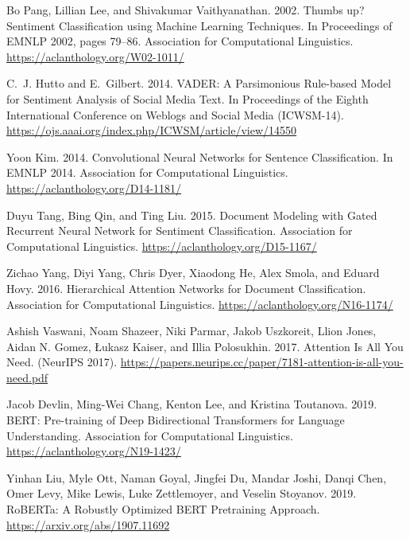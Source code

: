 \documentclass[12pt,a4paper]{article}
\begin{document}
\begin{thebibliography}{9}

Bo Pang, Lillian Lee, and Shivakumar Vaithyanathan. 2002. Thumbs up? Sentiment Classification using Machine Learning Techniques. In Proceedings of EMNLP 2002, pages 79–86. Association for Computational Linguistics. \url{https://aclanthology.org/W02-1011/}

C.~J. Hutto and E.~Gilbert. 2014. VADER: A Parsimonious Rule-based Model for Sentiment Analysis of Social Media Text. In Proceedings of the Eighth International Conference on Weblogs and Social Media (ICWSM-14). \url{https://ojs.aaai.org/index.php/ICWSM/article/view/14550}

Yoon Kim. 2014. Convolutional Neural Networks for Sentence Classification. In EMNLP 2014. Association for Computational Linguistics. \url{https://aclanthology.org/D14-1181/}

Duyu Tang, Bing Qin, and Ting Liu. 2015. Document Modeling with Gated Recurrent Neural Network for Sentiment Classification. Association for Computational Linguistics. \url{https://aclanthology.org/D15-1167/}

Zichao Yang, Diyi Yang, Chris Dyer, Xiaodong He, Alex Smola, and Eduard Hovy. 2016. Hierarchical Attention Networks for Document Classification. Association for Computational Linguistics. \url{https://aclanthology.org/N16-1174/}

Ashish Vaswani, Noam Shazeer, Niki Parmar, Jakob Uszkoreit, Llion Jones, Aidan N. Gomez, Łukasz Kaiser, and Illia Polosukhin. 2017. Attention Is All You Need.  (NeurIPS 2017). \url{https://papers.neurips.cc/paper/7181-attention-is-all-you-need.pdf}

Jacob Devlin, Ming-Wei Chang, Kenton Lee, and Kristina Toutanova. 2019. BERT: Pre-training of Deep Bidirectional Transformers for Language Understanding. Association for Computational Linguistics. \url{https://aclanthology.org/N19-1423/}

Yinhan Liu, Myle Ott, Naman Goyal, Jingfei Du, Mandar Joshi, Danqi Chen, Omer Levy, Mike Lewis, Luke Zettlemoyer, and Veselin Stoyanov. 2019. RoBERTa: A Robustly Optimized BERT Pretraining Approach. \url{https://arxiv.org/abs/1907.11692}

\end{thebibliography}
\end{document}

